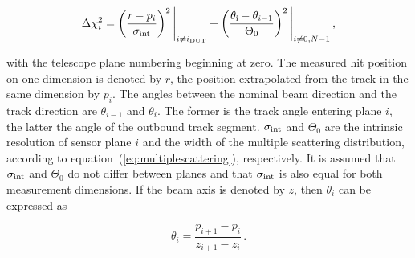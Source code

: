 \begin{equation}
\label{eq:chi2contrib}
\Delta \chi^2_{i} = \left( \frac{r - p_{i}}{\sigma_{\textrm{int}}} \right)^2 \Bigg|_{i \ne i_{\textrm{DUT}}} +
\left( \frac{\theta_{\textrm{i}} - \theta_{i-1}}{\Theta_{0}} \right)^2 \Bigg|_{i \ne 0,N-1} \,,
\end{equation}

\noindent
with the telescope plane numbering beginning at zero.
The measured hit position on one dimension is denoted by $r$, the position extrapolated from the track in the same dimension by $p_{i}$.
The angles between the nominal beam direction and the track direction are $\theta_{i-1}$ and $\theta_{i}$.
The former is the track angle entering plane $i$, the latter the angle of the outbound track segment.
$\sigma_{\textrm{int}}$ and $\Theta_{0}$ are the intrinsic resolution of sensor plane $i$ and the width of the multiple scattering distribution, according to equation~(\ref{eq:multiplescattering}), respectively.
It is assumed that $\sigma_{\textrm{int}}$ and $\Theta_{0}$ do not differ between planes and that $\sigma_{\textrm{int}}$ is also equal for both measurement dimensions.
If the beam axis is denoted by $z$, then $\theta_i$ can be expressed as

\begin{equation}
\theta_i = \frac{p_{i+1} - p_i}{z_{i+1} - z_i} \,.
\end{equation}


